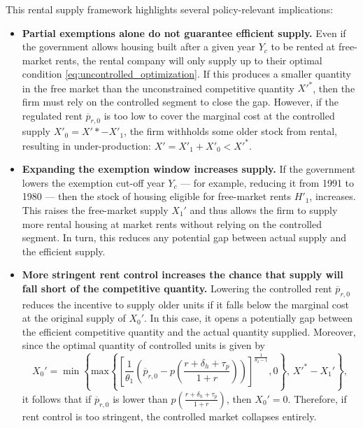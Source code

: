 \documentclass[parskip=full]{article}
\begin{document}
This rental supply framework highlights several policy-relevant implications:

\begin{itemize}

\item \textbf{Partial exemptions alone do not guarantee efficient supply.} 
Even if the government allows housing built after a given year $Y_{c}$ to be rented at free-market rents, the rental company will only supply up to their optimal condition \eqref{eq:uncontrolled_optimization}. If this produces a smaller quantity in the free market than the unconstrained competitive quantity $X'^*$, then the firm must rely on the controlled segment to close the gap. However, if the regulated rent $\overline{p}_{r,0}$ is too low to cover the marginal cost at the controlled supply $X'_0=X'*-X'_1$, the firm withholds some older stock from rental, resulting in under-production: $X'=X'_1+X'_0<X'^*$.

\item \textbf{Expanding the exemption window increases supply.} 
If the government lowers the exemption cut-off year $Y_{c}$ — for example, reducing it from 1991 to 1980 — then the stock of housing eligible for free-market rents $H'_1$, increases. This raises the free-market supply $X_1'$ and thus allows the firm to supply more rental housing at market rents without relying on the controlled segment. In turn, this reduces any potential gap between actual supply and the efficient supply.

\item \textbf{More stringent rent control increases the chance that supply will fall short of the competitive quantity.} 
Lowering the controlled rent $\overline{p}_{r,0}$ reduces the incentive to supply older units if it falls below the marginal cost at the original supply of $X_0'$. In this case, it opens a potentially gap between the efficient competitive quantity and the actual quantity supplied. Moreover, since the optimal quantity of controlled units is given by \[X_0'=\min\left\{\text{max}\left\{\left[\frac{1}{\theta_{1}}\left(\overline{p}_{r,0}-p\left(\frac{r+\delta_{h}+\tau_{p}}{1+r}\right)\right)\right]^{\frac{1}{\theta_{2}-1}},0\right\},\, X'^*-X_1'\right\},\]
it follows that if $\overline{p}_{r,0}$ is lower than  
$p\left(\frac{r+\delta_{h}+\tau_{p}}{1+r} \right)$, then $X_0'=0$. Therefore, if rent control is too stringent, the controlled market collapses entirely.

\end{itemize}
\end{document}

